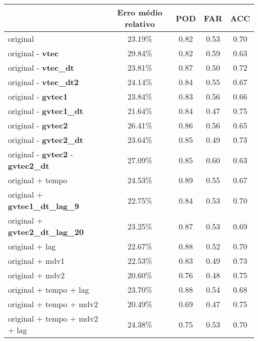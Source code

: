 \begin{table}
\begin{center}
\begin{tabular}{|l|c|c|c|c|} 
\hline
 
	                          & Erro médio relativo	& POD	& FAR	& ACC  \\ \hline
original                                      &  23.19\%  & 0.82  & 0.53  & 0.70 \\ \hline
original - {\bf vtec}                         &  29.84\%  & 0.82  & 0.59  & 0.63 \\ \hline
original - {\bf vtec\_dt}                     &  23.81\%  & 0.87  & 0.50  & 0.72 \\ \hline
original - {\bf vtec\_dt2}                    &  24.14\%  & 0.84  & 0.55  & 0.67 \\ \hline
original - {\bf gvtec1}                       &  23.84\%  & 0.83  & 0.56  & 0.66 \\ \hline
original - {\bf gvtec1\_dt}                   &  21.64\%  & 0.84  & 0.47  & 0.75 \\ \hline
original - {\bf gvtec2}                       &  26.41\%  & 0.86  & 0.56  & 0.65 \\ \hline
original - {\bf gvtec2\_dt}                   &  23.64\%  & 0.85  & 0.49  & 0.73 \\ \hline
original - {\bf gvtec2} - {\bf gvtec2\_dt}    &  27.09\%  & 0.85  & 0.60  & 0.63 \\ \hline
original + tempo                              &  24.53\%  & 0.89  & 0.55  & 0.67 \\ \hline
original + {\bf gvtec1\_dt\_lag\_9}           &  22.75\%  & 0.84  & 0.53  & 0.70 \\ \hline
original + {\bf gvtec2\_dt\_lag\_20}          &  23.25\%  & 0.87  & 0.53  & 0.69 \\ \hline
original + lag                                &  22.67\%  & 0.88  & 0.52  & 0.70 \\ \hline
original + mdv1                               &  22.53\%  & 0.83  & 0.49  & 0.73 \\ \hline
original + mdv2                               &  20.60\%  & 0.76  & 0.48  & 0.75 \\ \hline
original + tempo + lag                        &  23.70\%  & 0.88  & 0.54  & 0.68 \\ \hline
original + tempo + mdv2                       &  20.49\%  & 0.69  & 0.47  & 0.75 \\ \hline
original + tempo + mdv2 + lag                 &  24.38\%  & 0.75  & 0.53  & 0.70 \\ \hline

\end{tabular}
\end{center}
\end{table}
